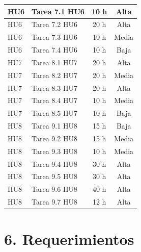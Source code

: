 \documentclass[
11pt, %
]{charter}
\begin{document}
\begin{table}[htpb]
\begin{tabularx}{\linewidth}{@{}|X|X|c|c|@{}}
HU6 & Tarea 7.1 HU6 & 10 h & Alta \\ \hline
HU6 & Tarea 7.2 HU6 & 20 h & Alta \\ \hline
HU6 & Tarea 7.3 HU6 & 10 h & Media \\ \hline
HU6 & Tarea 7.4 HU6 & 10 h & Baja \\ \hline

HU7 & Tarea 8.1 HU7 & 20 h & Alta \\ \hline
HU7 & Tarea 8.2 HU7 & 20 h & Media \\ \hline
HU7 & Tarea 8.3 HU7 & 20 h & Alta \\ \hline
HU7 & Tarea 8.4 HU7 & 10 h & Media \\ \hline
HU7 & Tarea 8.5 HU7 & 10 h & Baja \\ \hline

HU8 & Tarea 9.1 HU8 & 15 h & Baja \\ \hline
HU8 & Tarea 9.2 HU8 & 15 h & Media \\ \hline
HU8 & Tarea 9.3 HU8 & 10 h & Media \\ \hline
HU8 & Tarea 9.4 HU8 & 30 h & Alta \\ \hline
HU8 & Tarea 9.5 HU8 & 30 h & Alta \\ \hline
HU8 & Tarea 9.6 HU8 & 40 h & Alta \\ \hline
HU8 & Tarea 9.7 HU8 & 12 h & Alta \\ \hline

\end{tabularx}
\end{table}




































\section{6. Requerimientos}
\label{sec:requerimientos}
\end{document}

